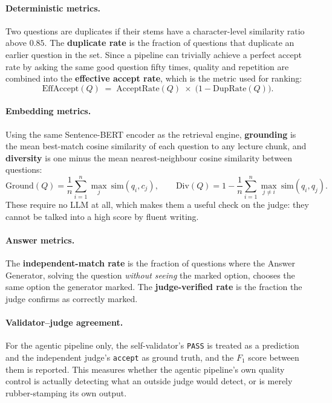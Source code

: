 \paragraph{Deterministic metrics.} Two questions are duplicates if their stems have
a character-level similarity ratio above $0.85$. The \textbf{duplicate rate} is the
fraction of questions that duplicate an earlier question in the set. Since a
pipeline can trivially achieve a perfect accept rate by asking the same good
question fifty times, quality and repetition are combined into the
\textbf{effective accept rate}, which is the metric used for ranking:
\begin{equation}
\label{eq:effacc}
\mathrm{EffAccept}(Q) \;=\; \mathrm{AcceptRate}(Q)\;\times\;\bigl(1 - \mathrm{DupRate}(Q)\bigr) .
\end{equation}

\paragraph{Embedding metrics.} Using the same Sentence-BERT encoder as the retrieval
engine, \textbf{grounding} is the mean best-match cosine similarity of each question
to any lecture chunk, and \textbf{diversity} is one minus the mean
nearest-neighbour cosine similarity between questions:
\begin{equation}
\mathrm{Ground}(Q) = \frac{1}{n}\sum_{i=1}^{n}\max_{j}\ \mathrm{sim}(q_i, c_j),
\qquad
\mathrm{Div}(Q) = 1 - \frac{1}{n}\sum_{i=1}^{n}\max_{j \neq i}\ \mathrm{sim}(q_i, q_j).
\end{equation}
These require no LLM at all, which makes them a useful check on the judge: they
cannot be talked into a high score by fluent writing.

\paragraph{Answer metrics.} The \textbf{independent-match rate} is the fraction of
questions where the Answer Generator, solving the question \emph{without seeing} the
marked option, chooses the same option the generator marked. The
\textbf{judge-verified rate} is the fraction the judge confirms as correctly marked.

\paragraph{Validator--judge agreement.} For the agentic pipeline only, the
self-validator's \texttt{PASS} is treated as a prediction and the independent judge's
\texttt{accept} as ground truth, and the $F_1$ score between them is reported. This
measures whether the agentic pipeline's own quality control is actually detecting
what an outside judge would detect, or is merely rubber-stamping its own output.

